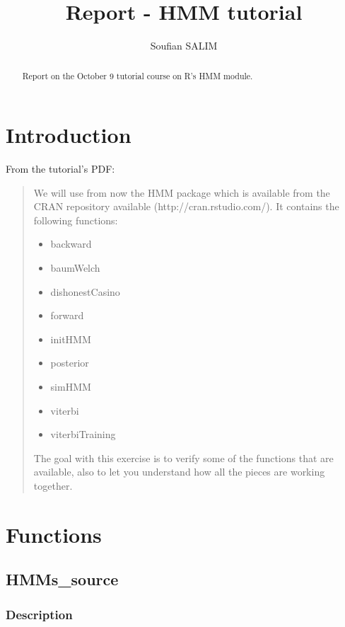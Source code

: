 \documentclass[a4paper]{article}
\title{Report - HMM tutorial}
\author{Soufian SALIM}
\begin{document}
\maketitle

\begin{abstract}
Report on the October 9 tutorial course on R's HMM module.

\end{abstract}

\section{Introduction}

From the tutorial's PDF:

\begin{quotation}

We will use from now the HMM package which is available from the CRAN repository
available
(http://cran.rstudio.com/).
It contains the following functions:

\begin{itemize}

\item backward
\item baumWelch
\item dishonestCasino
\item forward
\item initHMM
\item posterior
\item simHMM
\item viterbi
\item viterbiTraining

\end{itemize}

The goal with this exercise is to verify some of the functions that are available, also to let you
understand how all the pieces are working together.

\end{quotation}

\section{Functions}

\subsection{HMMs\_source}

\subsubsection{Description}
\end{document}
